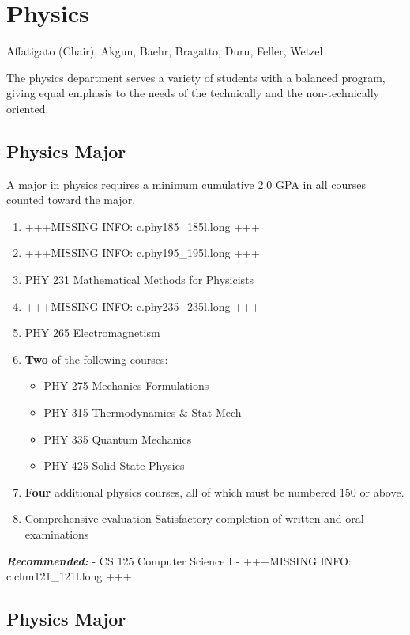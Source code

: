 \documentclass[
  letterpaper,
]{scrbook}
\providecommand{\tightlist}{%
  \setlength{\itemsep}{0pt}\setlength{\parskip}{0pt}}
\begin{document}
\section{Physics}\label{physics}

Affatigato (Chair), Akgun, Baehr, Bragatto, Duru, Feller, Wetzel

The physics department serves a variety of students with a balanced
program, giving equal emphasis to the needs of the technically and the
non-technically oriented.

\subsection{Physics Major}\label{physics-major}

A major in physics requires a minimum cumulative 2.0 GPA in all courses
counted toward the major.

\begin{enumerate}
\def\labelenumi{\arabic{enumi}.}
\item
  +++MISSING INFO: c.phy185\_185l.long +++
\item
  +++MISSING INFO: c.phy195\_195l.long +++
\item
  PHY 231 Mathematical Methods for Physicists
\item
  +++MISSING INFO: c.phy235\_235l.long +++
\item
  PHY 265 Electromagnetism
\item
  \textbf{Two} of the following courses:

  \begin{itemize}
  \tightlist
  \item
    PHY 275 Mechanics Formulations
  \item
    PHY 315 Thermodynamics \& Stat Mech
  \item
    PHY 335 Quantum Mechanics
  \item
    PHY 425 Solid State Physics
  \end{itemize}
\item
  \textbf{Four} additional physics courses, all of which must be
  numbered 150 or above.
\item
  Comprehensive evaluation Satisfactory completion of written and oral
  examinations
\end{enumerate}

\textbf{\emph{Recommended:}} - CS 125 Computer Science I - +++MISSING
INFO: c.chm121\_121l.long +++

\subsection{Physics Major}\label{physics-major-1}
\end{document}
